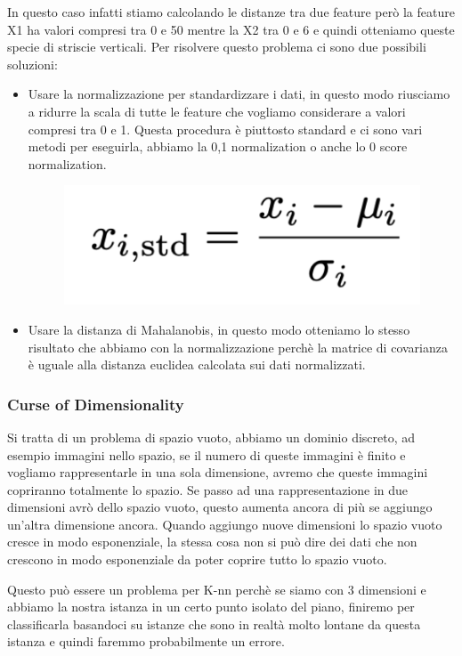 \documentclass[14pt]{extreport}
\begin{document}
		In questo caso infatti stiamo calcolando le distanze tra due feature però la feature X1 ha valori compresi tra 0 e 50 mentre la X2 tra 0 e 6 e quindi otteniamo queste specie di striscie verticali.
		Per risolvere questo problema ci sono due possibili soluzioni:

		\begin{itemize}
			\item Usare la normalizzazione per standardizzare i dati, in questo modo riusciamo a ridurre la scala di tutte le feature che vogliamo considerare a valori compresi tra 0 e 1. Questa procedura è piuttosto standard e ci sono vari metodi per eseguirla, abbiamo la 0,1 normalization o anche lo 0 score normalization.
			
\begin{figure}[H] 
	\centering
	\includegraphics[width=0.7\linewidth]{473.jpeg}
	\end{figure}
			\item Usare la distanza di Mahalanobis, in questo modo otteniamo lo stesso risultato che abbiamo con la normalizzazione perchè la matrice di covarianza è uguale alla distanza euclidea calcolata sui dati normalizzati.

			\end{itemize}

			\subsubsection{Curse of Dimensionality}
			
			Si tratta di un problema di spazio vuoto, abbiamo un dominio discreto, ad esempio immagini nello spazio, se il numero di queste immagini è finito e vogliamo rappresentarle in una sola dimensione, avremo che queste immagini copriranno totalmente lo spazio.
			Se passo ad una rappresentazione in due dimensioni avrò dello spazio vuoto, questo aumenta ancora di più se aggiungo un’altra dimensione ancora.
			Quando aggiungo nuove dimensioni lo spazio vuoto cresce in modo esponenziale, la stessa cosa non si può dire dei dati che non crescono in modo esponenziale da poter coprire tutto lo spazio vuoto.
			
			Questo può essere un problema per K-nn perchè se siamo con 3 dimensioni e abbiamo la nostra istanza in un certo punto isolato del piano, finiremo per classificarla basandoci su istanze che sono in realtà molto lontane da questa istanza e quindi faremmo probabilmente un errore.
\end{document}
